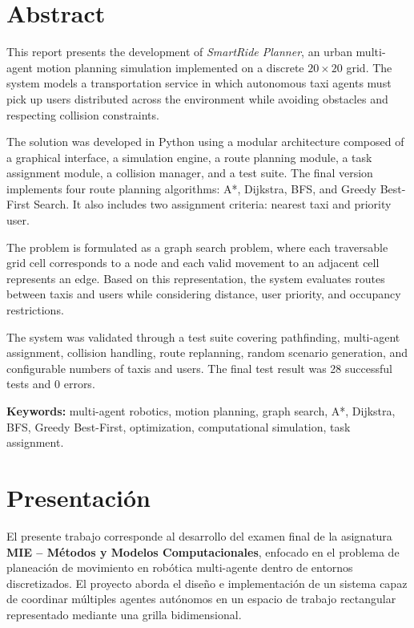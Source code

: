 \documentclass[12pt,a4paper]{article}
\begin{document}
\newpage

\section*{Abstract}
\justifying

This report presents the development of \textit{SmartRide Planner}, an urban multi-agent motion planning simulation implemented on a discrete $20 \times 20$ grid. The system models a transportation service in which autonomous taxi agents must pick up users distributed across the environment while avoiding obstacles and respecting collision constraints.

The solution was developed in Python using a modular architecture composed of a graphical interface, a simulation engine, a route planning module, a task assignment module, a collision manager, and a test suite. The final version implements four route planning algorithms: A*, Dijkstra, BFS, and Greedy Best-First Search. It also includes two assignment criteria: nearest taxi and priority user.

The problem is formulated as a graph search problem, where each traversable grid cell corresponds to a node and each valid movement to an adjacent cell represents an edge. Based on this representation, the system evaluates routes between taxis and users while considering distance, user priority, and occupancy restrictions.

The system was validated through a test suite covering pathfinding, multi-agent assignment, collision handling, route replanning, random scenario generation, and configurable numbers of taxis and users. The final test result was 28 successful tests and 0 errors.

\textbf{Keywords:} multi-agent robotics, motion planning, graph search, A*, Dijkstra, BFS, Greedy Best-First, optimization, computational simulation, task assignment.

\newpage

\section{Presentación}
\justifying

El presente trabajo corresponde al desarrollo del examen final de la asignatura \textbf{MIE -- Métodos y Modelos Computacionales}, enfocado en el problema de planeación de movimiento en robótica multi-agente dentro de entornos discretizados. El proyecto aborda el diseño e implementación de un sistema capaz de coordinar múltiples agentes autónomos en un espacio de trabajo rectangular representado mediante una grilla bidimensional.
\end{document}
